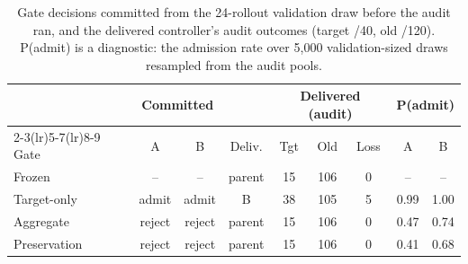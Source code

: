 \begin{table}[t]
\centering
\small
\setlength{\tabcolsep}{2.6pt}
\begin{tabular}{lcccccccc}
\toprule
 & \multicolumn{2}{c}{Committed} & & \multicolumn{3}{c}{Delivered (audit)} & \multicolumn{2}{c}{P(admit)} \\
\cmidrule(lr){2-3}\cmidrule(lr){5-7}\cmidrule(lr){8-9}
Gate & A & B & Deliv. & Tgt & Old & Loss & A & B \\
\midrule
Frozen & -- & -- & parent & 15 & 106 & 0 & -- & -- \\
Target-only & admit & admit & B & 38 & 105 & 5 & 0.99 & 1.00 \\
Aggregate & reject & reject & parent & 15 & 106 & 0 & 0.47 & 0.74 \\
Preservation & reject & reject & parent & 15 & 106 & 0 & 0.41 & 0.68 \\
\bottomrule
\end{tabular}
\caption{Gate decisions committed from the 24-rollout validation draw before the audit ran, and the delivered controller's audit outcomes (target /40, old /120). P(admit) is a diagnostic: the admission rate over 5{,}000 validation-sized draws resampled from the audit pools.}
\label{tab:gates}
\end{table}
